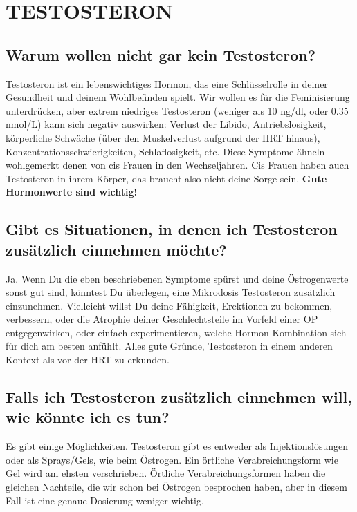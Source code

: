 \documentclass{article}
\begin{document}
{{{\section{TESTOSTERON}\label{T}

\subsection{Warum wollen nicht \textbf{gar kein} Testosteron?}

Testosteron ist ein lebenswichtiges Hormon, das eine Schlüsselrolle in deiner Gesundheit und deinem Wohlbefinden spielt. Wir wollen es für die Feminisierung unterdrücken, aber extrem niedriges Testosteron (weniger als 10 ng/dl, oder 0.35 nmol/L) kann sich negativ auswirken: Verlust der Libido, Antriebslosigkeit, körperliche Schwäche (über den Muskelverlust aufgrund der HRT hinaus), Konzentrationsschwierigkeiten, Schlaflosigkeit, etc. Diese Symptome ähneln wohlgemerkt denen von cis Frauen in den Wechseljahren. Cis Frauen haben auch Testosteron in ihrem Körper, das braucht also nicht deine Sorge sein. \textbf{Gute Hormonwerte sind wichtig!}

\subsection{Gibt es Situationen, in denen ich Testosteron zusätzlich einnehmen möchte?}\label{9-2}

Ja. Wenn Du die eben beschriebenen Symptome spürst und deine Östrogenwerte sonst gut sind, könntest Du überlegen, eine Mikrodosis Testosteron zusätzlich einzunehmen. Vielleicht willst Du deine Fähigkeit, Erektionen zu bekommen, verbessern, oder die Atrophie deiner Geschlechtsteile im Vorfeld einer OP entgegenwirken, oder einfach experimentieren, welche Hormon-Kombination sich für dich am besten anfühlt. Alles gute Gründe, Testosteron in einem anderen Kontext als vor der HRT zu erkunden.

\subsection{Falls ich Testosteron zusätzlich einnehmen will, wie könnte ich es tun?}

Es gibt einige Möglichkeiten. Testosteron gibt es entweder als Injektionslösungen oder als Sprays/Gels, wie beim Östrogen. Ein örtliche Verabreichungsform wie Gel wird am ehsten verschrieben. Örtliche Verabreichungsformen haben die gleichen Nachteile, die wir schon bei Östrogen besprochen haben, aber in diesem Fall ist eine genaue Dosierung weniger wichtig.

}}}
\end{document}
